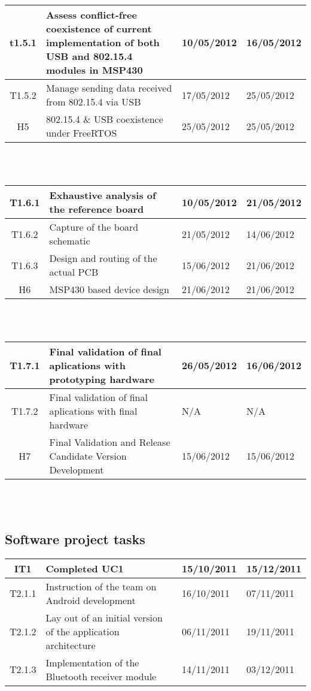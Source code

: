 		\begin{tabular}{| c | p{6cm} | l | l |} %
		\hline
t1.5.1 & Assess conflict-free coexistence of current implementation of both USB and 802.15.4 modules in MSP430 & 10/05/2012 & 16/05/2012\\ \hline
T1.5.2 & Manage sending data received from 802.15.4 via USB & 17/05/2012 & 25/05/2012\\ \hline
H5 & 802.15.4 \& USB coexistence under FreeRTOS & 25/05/2012 & 25/05/2012\\ \hline
		\end{tabular}\\\\

		\begin{tabular}{| c | p{6cm} | l | l |} %
		\hline
T1.6.1 & Exhaustive analysis of the reference board & 10/05/2012 & 21/05/2012\\ \hline
T1.6.2 & Capture of the board schematic & 21/05/2012 & 14/06/2012\\ \hline
T1.6.3 & Design and routing of the actual PCB & 15/06/2012 & 21/06/2012\\ \hline
H6 & MSP430 based device design & 21/06/2012 & 21/06/2012\\ \hline
		\end{tabular}\\\\

		\begin{tabular}{| c | p{6cm} | l | l |} %
		\hline
T1.7.1 & Final validation of final aplications with prototyping hardware & 26/05/2012 & 16/06/2012\\ \hline
T1.7.2 & Final validation of final aplications with final hardware & N/A & N/A \\ \hline
H7 & Final Validation and Release Candidate Version Development & 15/06/2012 & 15/06/2012\\
		\hline
		\end{tabular}\\\\

		\newpage
		\subsection{Software project tasks}

		\begin{tabular}{| c | p{6cm} | l | l |} %
		\hline
IT1 & Completed UC1 & 15/10/2011 & 15/12/2011\\ \hline
   T2.1.1 & Instruction of the team on Android development & 16/10/2011 & 07/11/2011\\ \hline
   T2.1.2 & Lay out of an initial version of the application architecture & 06/11/2011 & 19/11/2011\\ 
   T2.1.3 & Implementation of the Bluetooth receiver module & 14/11/2011 & 03/12/2011\\ \hline
		\end{tabular}\\\\

